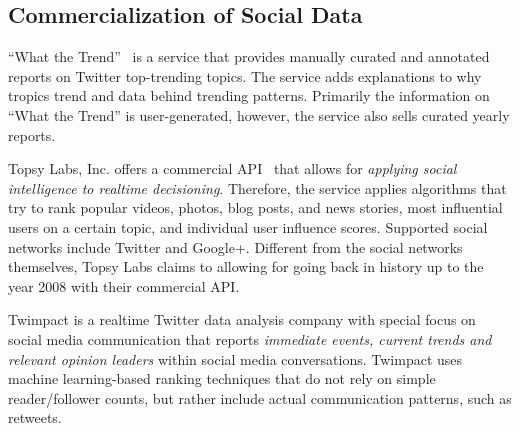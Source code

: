 \documentclass{iosart2c}
\begin{document}
\subsection{Commercialization of Social Data}
``What the Trend''~\cite{whatthetrend} is a service that provides manually curated and annotated reports on Twitter top-trending topics.
The service adds explanations to why tropics trend and data behind trending patterns.
Primarily the information on ``What the Trend'' is user-generated, however, the service also sells curated yearly reports.

Topsy Labs, Inc. offers a commercial API~\cite{topsy} that allows for \textit{applying social intelligence to realtime decisioning}.
Therefore, the service applies algorithms that try to rank popular videos, photos, blog posts, and news stories, most influential users on a certain topic, and individual user influence scores.
Supported social networks include Twitter and Google+.
Different from the social networks themselves, Topsy Labs claims to allowing for going back in history up to the year 2008 with their commercial API.

Twimpact \cite{twimpact} is a realtime Twitter data analysis company with special focus on social media communication that reports \textit{immediate events, current trends and relevant opinion leaders} within social media conversations.
Twimpact uses machine learning-based ranking techniques that do not rely on simple reader/follower counts, but rather include actual communication patterns, such as retweets. 
\end{document}
